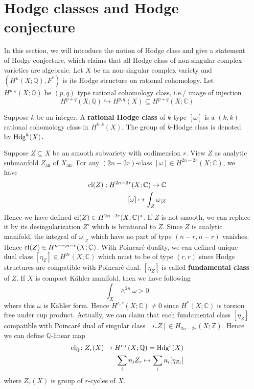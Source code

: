\documentclass[oneside,a4paper]{amsart}
\begin{document}
\section{Hodge classes and Hodge conjecture}
In this section, we will introduce the notion of Hodge class and give a statement of Hodge conjecture, which claims that all Hodge class of non-singular complex varieties are algebraic. Let $X$ be an non-singular complex variety and $(H^n(X;\mathbb{Q}),F^*)$ is its Hodge structure on rational cohomology. Let $H^{p,q}(X;\mathbb{Q})$ be $(p,q)$ type rational cohomology class, i.e./ image of injection
\begin{equation}
	H^{p+q}(X;\mathbb{Q}) \hookrightarrow H^{p,q}(X) \subseteq H^{p+q}(X;\mathbb{C})
\end{equation}
\begin{secdefn}
	Suppose $k$ be an integer. A \textbf{rational Hodge class} of $k$ type $[\omega]$ is a $(k,k)$-rational cohomology class in $H^{k,k}(X)$. The group of $k$-Hodge class is denoted by $\operatorname{Hdg}^k(X)$.
\end{secdefn}
Suppose $Z \subseteq X$ be an smooth subvariety with codimension $r$. View $Z$ as analytic submanfold $Z_\text{an}$ of $X_\text{an}$. For any $(2n-2r)$-class $[\omega] \in H^{2n-2r}(X;\mathbb{C})$, we have
\begin{align*}
\operatorname{cl}(Z):H^{2n-2r}(X;\mathbb{C}) \rightarrow \mathbb{C}\\
[\omega] \mapsto \int_{Z} \omega_{|Z}
\end{align*}
Hence we have defined $\operatorname{cl}(Z) \in H^{2n-2r}(X;\mathbb{C})^*$. If $Z$ is not smooth, we can replace it by its desingularization $Z'$ which is birational to $Z$. Since $Z$ is analytic manifold, the integral of $\omega|_Z$ which have no part of type $(n-r,n-r)$ vanishes. Hence $\operatorname{cl}(Z) \in H^{n-r,n-r}(X; \mathbb{C})$.
With Poincar\'e duality, we can defined unique dual class $[\eta_Z] \in H^{2r}(X;\mathbb{C})$ which must to be of type $(r,r)$ since Hodge structures are compatible with Poincar\'e dual. $[\eta_Z]$ is called \textbf{fundamental class} of $Z$.
If $X$ is compact K\"ahler manifold, then we have following 
\begin{equation}
	\int_{X} \wedge^{2n}\omega >0 
\end{equation}
where this $\omega$ is K\"ahler form. Hence $H^{r,r}(X;\mathbb{C}) \neq 0$ since $H^*(X;\mathbb{C})$ is torsion free under cup product.
Actually, we can claim that each fundamental class $[\eta_Z]$ compatible with Poincar\'e dual of singular class $[i_*Z] \in H_{2n-2r}(X;\mathbb{Z})$. Hence we can define $\mathbb{Q}$-linear map
\begin{align*}
	\operatorname{cl_\mathbb{Q}} \colon Z_r(X) \to H^{r,r}(X;\mathbb{Q})=\operatorname{Hdg}^r(X)\\
	\sum_i n_i Z_r \mapsto \sum_i n_i [\eta_{Z_i}]	
\end{align*}
where $Z_r(X)$ is group of $r$-cycles of $X$.
\end{document}

